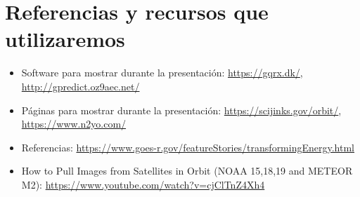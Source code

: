 \section{Referencias y recursos que utilizaremos}
\begin{itemize}
    \item Software para mostrar durante la presentación: \url{https://gqrx.dk/}, \url{http://gpredict.oz9aec.net/}
    \item Páginas para mostrar durante la presentación: \url{https://scijinks.gov/orbit/}, \url{https://www.n2yo.com/}
    \item Referencias: \url{https://www.goes-r.gov/featureStories/transformingEnergy.html}
    \item How to Pull Images from Satellites in Orbit (NOAA 15,18,19 and METEOR M2): \url{https://www.youtube.com/watch?v=cjClTnZ4Xh4}
\end{itemize}

